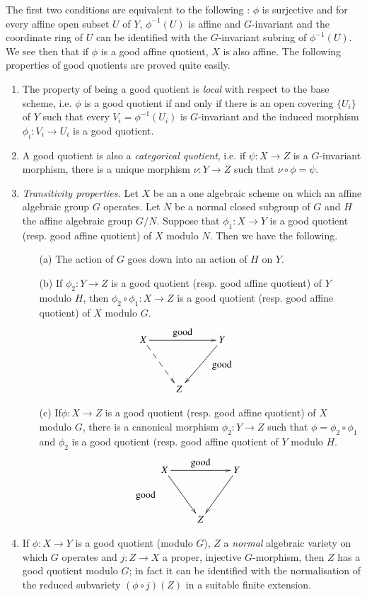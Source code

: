 The first two conditions are equivalent to the following : $\phi$ is surjective and for every affine open subset $U$ of $Y$, $\phi^{-1}(U)$ is affine and $G$-invariant and the coordinate ring of $U$ can be identified with the $G$-invariant subring of $\phi^{-1}(U)$. We see then that if $\phi$ is a good affine quotient, $X$ is also affine. The following properties of good quotients are proved quite easily.
\begin{enumerate}
\renewcommand{\labelenumi}{(\theenumi)}
\item The property of being a good quotient is {\em local} with respect to the base scheme, i.e. $\phi$ is a good quotient if and only if there is an open covering $\{U_{i}\}$ of $Y$ such that every $V_{i}=\phi^{-1}(U_{i})$ is $G$-invariant and the induced morphism $\phi_{i}:V_{i}\to U_{i}$ is a good quotient.

\item A good quotient is also a {\em categorical quotient}, i.e. if $\psi:X\to Z$ is a $G$-invariant morphism, there is a unique morphism $\nu : Y\to Z$ such that $\nu\circ \phi=\psi$.

\item {\em Transitivity properties.} Let $X$ be an a one algebraic scheme on which an affine algebraic group $G$ operates. Let $N$ be a normal closed subgroup of $G$ and $H$ the affine algebraic group $G/N$. Suppose that $\phi_{1}:X\to Y$ is a good quotient (resp. good affine quotient) of $X$ modulo $N$. Then we have the following.
\begin{itemize}
\item[(a)] The action of $G$ goes down into an action of $H$ on $Y$.

\item[(b)] If $\phi_{2}:Y\to Z$ is a good quotient (resp. good affine quotient) of $Y$ modulo $H$, then $\phi_{2}\circ \phi_{1}:X\to Z$ is a good quotient (resp. good affine quotient) of $X$ modulo $G$.
\[
\xymatrix@R=.4cm{
X\ar[rr]^{\displaystyle\text{good}}\ar@{-->}[ddr]& & Y\ar[ddl] &\\
 & & \text{good}\\
 & Z &  
}
\]

\item[(c)] If\pageoriginale $\phi : X\to Z$ is a good quotient (resp. good affine quotient) of $X$ modulo $G$, there is a canonical morphism $\phi_{2}:Y\to Z$ such that $\phi=\phi_{2}\circ \phi_{1}$ and $\phi_{2}$ is a good quotient (resp. good affine quotient of $Y$ modulo $H$.
\[
\xymatrix@R=.4cm{
& X\ar[rr]^{\displaystyle\text{good}}\ar[ddr]& & Y\ar[ddl] &\\
\text{good\kern -1cm} & && \\
 && Z &  
}
\]
\end{itemize}

\item If $\phi:X\to Y$ is a good quotient (modulo $G$), $Z$ a {\em normal} algebraic variety on which $G$ operates and $j:Z\to X$ a proper, injective $G$-morphism, then $Z$ has a good quotient modulo $G$; in fact it can be identified with the normalisation of the reduced subvariety $(\phi\circ j)(Z)$ in a suitable finite extension.
\end{enumerate}

